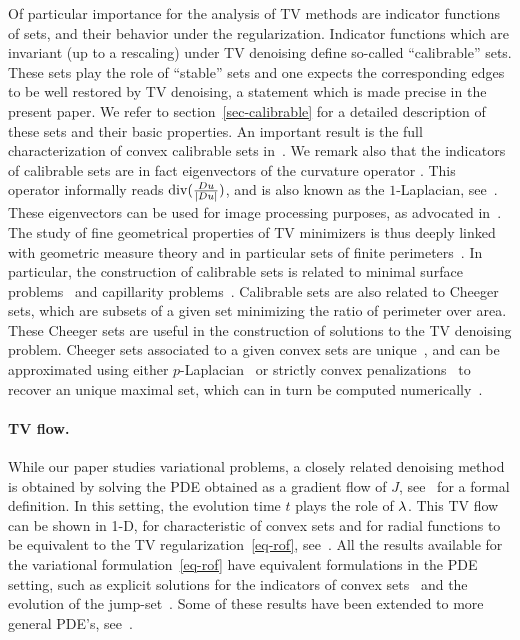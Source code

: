 Of particular importance for the analysis of TV methods are indicator functions of sets, and their behavior under the regularization.
%
Indicator functions which are invariant (up to a rescaling) under TV denoising define so-called ``calibrable'' sets. These sets play the role of ``stable'' sets and one expects the corresponding edges to be well restored by TV denoising, a statement which is made precise in the present paper. 
%
We refer to section~\ref{sec-calibrable} for a detailed description of these sets and their basic properties. 
%
An important result is the full characterization of convex calibrable sets in~\cite{altercalib05}.
%
We remark also that the indicators of calibrable sets are in fact eigenvectors of the curvature operator \cite{BellettiniEigen05}. This operator informally reads $\operatorname{div}(\tfrac{D u}{|Du|})$, and is also known as the $1$-Laplacian, see~\cite{Kawohl07}. These eigenvectors can be used for image processing purposes, as advocated in~\cite{Benning13}.
%
The study of fine geometrical properties of TV minimizers is thus deeply linked with geometric measure theory and in particular sets of finite perimeters~\cite{ambcasmas99,maggi2012sets}. In particular, the construction of calibrable sets is related to minimal surface problems~\cite{giusti1977minimal} and capillarity problems~\cite{Kor93}.
%
Calibrable sets are also related to Cheeger sets, which are subsets of a given set minimizing the ratio of perimeter over area. These Cheeger sets are useful in the construction of  solutions to the TV denoising problem. Cheeger sets associated to a given convex sets are unique~\cite{casuniq07,alteruniq09,kawohl06}, and can be approximated using either $p$-Laplacian~\cite{kawohlnovaga} or strictly convex penalizations~\cite{buttmaximal07} to recover an unique maximal set, which can in turn be computed numerically~\cite{carlierpeyre}. 

\paragraph{TV flow.}

While our paper studies variational problems, a closely related denoising method is obtained by solving the PDE obtained as a gradient flow of $J$, see~\cite{beltvflow02} for a formal definition. In this setting, the evolution time $t$ plays the role of $\lambda$. 
% 
This TV flow can be shown in 1-D, for characteristic of convex sets and for radial functions to be equivalent to the TV regularization~\eqref{eq-rof}, see~\cite{Ring00,Briani2011,BroxEquiv,Jalalzai2015}.
%
All the results available for the variational formulation~\eqref{eq-rof} have equivalent formulations in the PDE setting, such as explicit solutions for the indicators of convex sets~\cite{alter2005evolution} and the evolution of the jump-set~\cite{CasellesJumpFlow}. Some of these results have been extended to more general PDE's, see~\cite{andreu2004parabolic}. 



